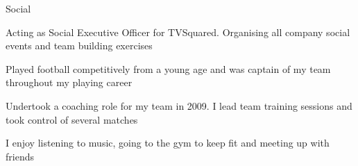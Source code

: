 \begin{cventries}
  \cventry
    {Social}
    {}
    {}
    {}
    {
      \begin{cvitems}
        \item {Acting as Social Executive Officer for TVSquared. Organising all company social events and team building exercises}
        \item {Played football competitively from a young age and was captain of my team throughout my playing career}
        \item {Undertook a coaching role for my team in 2009. I lead team training sessions and took control of several matches}
        \item {I enjoy listening to music, going to the gym to keep fit and meeting up with friends}
      \end{cvitems}
    }
\end{cventries}
